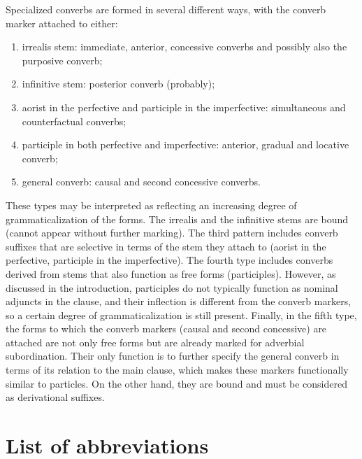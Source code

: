 ﻿\documentclass[output=paper]{langsci/langscibook}
\begin{document}
Specialized converbs are formed in several different ways, with the
converb marker attached to either:
\begin{enumerate}[topsep=\medskipamount,itemsep=0pt,partopsep=0pt,parsep=0pt,label={\arabic*})]
\item %
  irrealis stem: immediate, anterior, concessive converbs and possibly
also the purposive converb;

\item %
  infinitive stem: posterior converb (probably);

\item %
  aorist in the perfective and participle in the imperfective:
simultaneous and counterfactual converbs;

\item %
  participle in both perfective and imperfective: anterior, gradual
and locative converb;

\item %
  general converb: causal and second concessive converbs.
\end{enumerate}

These types may be interpreted as reflecting an increasing degree of
grammaticalization of the forms. The irrealis and the infinitive stems
are bound (cannot appear without further marking). The third pattern includes  
converb suffixes that are selective in terms of the stem they attach to (aorist in the
perfective, participle in the imperfective). The fourth type includes 
converbs derived from stems that also function as free forms (participles).
However, as discussed in the introduction, participles do not typically
function as nominal adjuncts in the clause, and their inflection is
different from the converb markers, so a certain degree of
grammaticalization is still present. Finally, in the fifth type, the forms to which the converb
markers (causal and second concessive) are attached are not only free forms but are already marked for adverbial
subordination. Their only function is to further specify the general converb in terms of its relation 
to the main clause, which makes these markers functionally similar to particles. On the other hand, they are bound 
and must be considered as derivational suffixes.


\clearpage

\section*{List of abbreviations}
\end{document}
